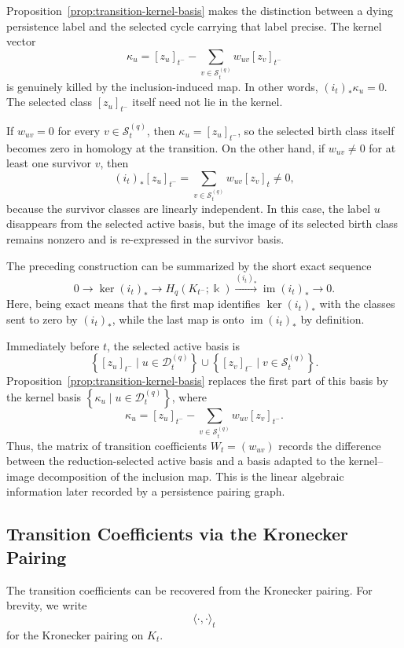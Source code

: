 \documentclass[11pt]{article}
\theoremstyle{paperdefinition}
\theoremstyle{paperplain}
\theoremstyle{paperremark}
\begin{document}
Proposition~\ref{prop:transition-kernel-basis} makes the distinction between a dying persistence label and the selected cycle carrying that label precise. The kernel vector
\[
\kappa_u = [z_u]_{t^-} - \sum_{v\in\mathcal S_t^{(q)}}w_{uv}[z_v]_{t^-}
\]
is genuinely killed by the inclusion-induced map. In other words, $(i_t)_*\kappa_u=0$. The selected class $[z_u]_{t^-}$ itself need not lie in the kernel.

If $w_{uv}=0$ for every $v\in\mathcal S_t^{(q)}$, then $\kappa_u=[z_u]_{t^-}$, so the selected birth class itself becomes zero in homology at the transition. On the other hand, if $w_{uv}\neq0$ for at least one survivor $v$, then
\[
(i_t)_*[z_u]_{t^-} = \sum_{v\in\mathcal S_t^{(q)}} w_{uv}[z_v]_t \neq0,
\]
because the survivor classes are linearly independent. In this case, the label $u$ disappears from the selected active basis, but the image of its selected birth class remains nonzero and is re-expressed in the survivor basis.

The preceding construction can be summarized by the short exact sequence
\[
0 \longrightarrow \ker(i_t)_* \longrightarrow H_q(K_{t^-};\Bbbk) \xrightarrow{(i_t)_*} \operatorname{im}(i_t)_* \longrightarrow 0.
\]
Here, being exact means that the first map identifies $\ker(i_t)_*$ with the classes sent to zero by $(i_t)_*$, while the last map is onto $\operatorname{im}(i_t)_*$ by definition.

Immediately before $t$, the selected active basis is
\[
\left\{[z_u]_{t^-}\mid u\in\mathcal D_t^{(q)}\right\} \cup \left\{[z_v]_{t^-}\mid v\in\mathcal S_t^{(q)}\right\}.
\]
Proposition~\ref{prop:transition-kernel-basis} replaces the first part of this basis by the kernel basis $\left\{\kappa_u\mid u\in\mathcal D_t^{(q)}\right\}$, where
\[
\kappa_u = [z_u]_{t^-} - \sum_{v\in\mathcal S_t^{(q)}}w_{uv}[z_v]_{t^-}.
\]
Thus, the matrix of transition coefficients $W_t=(w_{uv})$ records the difference between the reduction-selected active basis and a basis adapted to the kernel--image decomposition of the inclusion map. This is the linear algebraic information later recorded by a persistence pairing graph.

\subsection{Transition Coefficients via the Kronecker Pairing}
\label{subsec:kronecker-coordinates}

The transition coefficients can be recovered from the Kronecker pairing. For brevity, we write
\[
\langle\cdot,\cdot\rangle_t
\]
for the Kronecker pairing on $K_t$.
\end{document}
